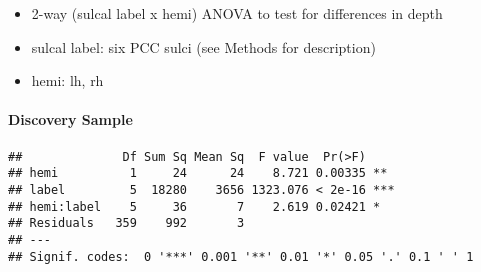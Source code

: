 \documentclass[
]{article}
\newenvironment{Shaded}{\begin{snugshade}}{\end{snugshade}}
\newcommand{\CommentTok}[1]{\textcolor[rgb]{0.56,0.35,0.01}{\textit{#1}}}
\newcommand{\DataTypeTok}[1]{\textcolor[rgb]{0.13,0.29,0.53}{#1}}
\newcommand{\KeywordTok}[1]{\textcolor[rgb]{0.13,0.29,0.53}{\textbf{#1}}}
\newcommand{\NormalTok}[1]{#1}
\newcommand{\OperatorTok}[1]{\textcolor[rgb]{0.81,0.36,0.00}{\textbf{#1}}}
\newcommand{\StringTok}[1]{\textcolor[rgb]{0.31,0.60,0.02}{#1}}
\providecommand{\tightlist}{%
  \setlength{\itemsep}{0pt}\setlength{\parskip}{0pt}}
\begin{document}
\begin{itemize}
\tightlist
\item
  2-way (sulcal label x hemi) ANOVA to test for differences in depth
\item
  sulcal label: six PCC sulci (see Methods for description)
\item
  hemi: lh, rh
\end{itemize}

\hypertarget{discovery-sample-1}{%
\paragraph{Discovery Sample}\label{discovery-sample-1}}

\begin{Shaded}
\end{Shaded}

\begin{verbatim}
##              Df Sum Sq Mean Sq  F value  Pr(>F)    
## hemi          1     24      24    8.721 0.00335 ** 
## label         5  18280    3656 1323.076 < 2e-16 ***
## hemi:label    5     36       7    2.619 0.02421 *  
## Residuals   359    992       3                     
## ---
## Signif. codes:  0 '***' 0.001 '**' 0.01 '*' 0.05 '.' 0.1 ' ' 1
\end{verbatim}
\end{document}
